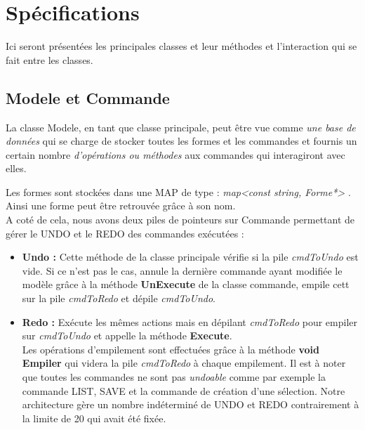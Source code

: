 \documentclass[12pt]{article}
\begin{document}
\section{Spécifications}
Ici seront présentées les principales classes et leur méthodes et l’interaction qui se fait entre les classes.
\subsection{Modele et Commande}
La classe Modele, en tant que classe principale, peut être vue comme \textit{ une base de données} qui se charge de stocker toutes les formes et les commandes et fournis un certain nombre \textit{ d’opérations ou méthodes } aux commandes qui interagiront avec elles. 

Les formes sont stockées dans une MAP de type : \textit{ map<const string, Forme*> }. Ainsi une forme peut être retrouvée grâce à son nom.
\\A coté de cela, nous avons deux piles de pointeurs sur Commande permettant de gérer le UNDO et le REDO des commandes exécutées : 
\newline
\begin{itemize}
\item \textbf{Undo :} Cette méthode de la classe principale vérifie si la pile \textit{ cmdToUndo} est vide. Si ce n'est pas le cas, annule la dernière commande ayant modifiée le modèle grâce à la méthode \textbf{UnExecute} de la classe commande, empile cett sur la pile \textit{cmdToRedo} et dépile \textit{cmdToUndo}.
\item \textbf{Redo :} Exécute les mêmes actions mais en dépilant	\textit{cmdToRedo} pour empiler sur \textit{cmdToUndo} et appelle la méthode \textbf{Execute}. \\
Les opérations d'empilement sont effectuées grâce à la méthode \textbf{void Empiler} qui videra la pile \textit{cmdToRedo} à chaque empilement. Il est à noter que toutes les commandes ne sont pas \textit{undoable} comme par exemple la commande LIST, SAVE et la commande de création d'une sélection. Notre architecture gère un nombre indéterminé de UNDO et REDO contrairement à la limite de 20 qui avait été fixée.
\end{itemize}
\end{document}

